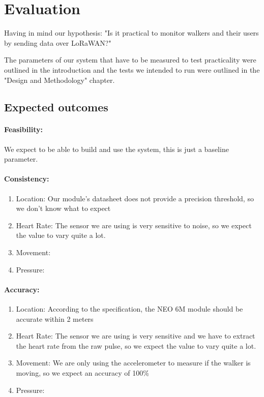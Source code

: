 \chapter{Evaluation}
\label{cha:evaluation}

Having in mind our hypothesis: "Is it practical to monitor walkers and their users by sending data over LoRaWAN?"

The parameters of our system that have to be measured to test practicality were outlined in the introduction and the tests we intended to run were outlined in the "Design and Methodology" chapter.

\section{Expected outcomes}
\subsubsection{Feasibility:}
We expect to be able to build and use the system, this is just a baseline parameter.

\subsubsection{Consistency:}
\begin{enumerate}
	\item Location: Our module's datasheet does not provide a precision threshold, so we don't know what to expect
	\item Heart Rate: The sensor we are using is very sensitive to noise, so we expect the value to vary quite a lot.
	\item Movement: 
	\item Pressure: 
\end{enumerate}

\subsubsection{Accuracy:}
\begin{enumerate}
	\item Location: According to the specification, the NEO 6M module should be accurate within 2 meters
	\item Heart Rate: The sensor we are using is very sensitive and we have to extract the heart rate from the raw pulse, so we expect the value to vary quite a lot.
	\item Movement: We are only using the accelerometer to measure if the walker is moving, so we expect an accuracy of 100\%  
	\item Pressure: 
\end{enumerate}

